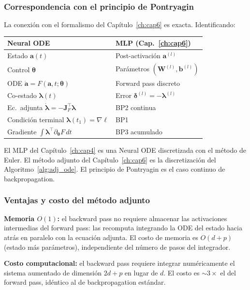 \subsubsection*{Correspondencia con el principio de Pontryagin}

La conexión con el formalismo del Capítulo~\ref{ch:cap6} es exacta. Identificando:
\begin{center}
\begin{tabular}{ll}
\toprule
\textbf{Neural ODE} & \textbf{MLP (Cap.~\ref{ch:cap6})} \\
\midrule
Estado $\bm{a}(t)$ & Post-activación $\bm{a}^{(l)}$ \\
Control $\bm{\theta}$ & Parámetros $(\bm{W}^{(l)},\bm{b}^{(l)})$ \\
ODE $\dot{\bm{a}} = F(\bm{a},t;\bm{\theta})$ & Forward pass discreto \\
Co-estado $\bm{\lambda}(t)$ & Error $\bm{\delta}^{(l)} = -\bm{\lambda}^{(l)}$ \\
Ec.\ adjunta $\dot{\bm{\lambda}} = -\bm{J}_F^\top\bm{\lambda}$ & BP2 continua \\
Condición terminal $\bm{\lambda}(t_1) = \nabla\ell$ & BP1 \\
Gradiente $\int\bm{\lambda}^\top\partial_{\bm{\theta}}F\,dt$ & BP3 acumulado \\
\bottomrule
\end{tabular}
\end{center}

El MLP del Capítulo~\ref{ch:cap4} es una Neural ODE discretizada con el método de Euler.
El método adjunto del Capítulo~\ref{ch:cap6} es la discretización del Algoritmo~\ref{alg:adj_ode}.
El principio de Pontryagin es el caso continuo de backpropagation.

\subsubsection*{Ventajas y costo del método adjunto}

\medskip
\noindent\textbf{Memoria $O(1)$:} el backward pass no requiere almacenar las
activaciones intermedias del forward pass: las recomputa integrando la ODE
del estado hacia atrás en paralelo con la ecuación adjunta. El costo de memoria
es $O(d + p)$ (estado más parámetros), independiente del número de pasos del
integrador.

\medskip
\noindent\textbf{Costo computacional:} el backward pass requiere integrar
numéricamente el sistema aumentado de dimensión $2d + p$ en lugar de $d$.
El costo es $\sim 3\times$ el del forward pass, idéntico al de backpropagation
estándar.

